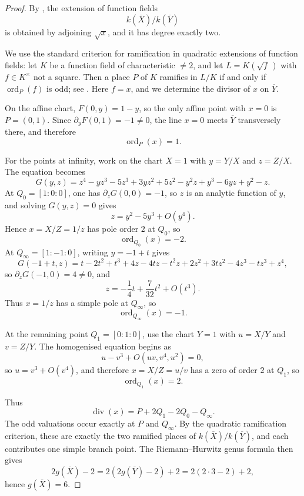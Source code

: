 \begin{proof}

By , the extension of function fields
\[
  k(\overline{X})/k(\overline{Y})
\]
is obtained by adjoining \(\sqrt{x}\), and it has degree exactly two.

We use the standard criterion for ramification in quadratic extensions
of function fields: let \(K\) be a function field of characteristic
\(\neq 2\), and let \(L=K(\sqrt{f}\,)\) with \(f\in K^\times\) not a
square. Then a place \(P\) of \(K\) ramifies in \(L/K\) if and only if
\(\operatorname{ord}_P(f)\) is odd; see \cite[III.7.3]{Stichtenoth2009}.
Here \(f=x\), and we determine the divisor of \(x\) on \(\overline{Y}\).

On the affine chart, \(F(0,y)=1-y\), so the only affine point with
\(x=0\) is \(P=(0,1)\). Since \(\partial_y F(0,1)=-1\neq 0\), the line
\(x=0\) meets \(\overline{Y}\) transversely there, and therefore
\[
  \operatorname{ord}_P(x)=1.
\]

For the points at infinity, work on the chart \(X=1\) with
\(y=Y/X\) and \(z=Z/X\). The equation becomes
\[
  G(y,z)=z^4-yz^3-5z^3+3yz^2+5z^2-y^2z+y^3-6yz+y^2-z.
\]
At \(Q_0=[1:0:0]\), one has \(\partial_z G(0,0)=-1\), so \(z\) is an
analytic function of \(y\), and solving \(G(y,z)=0\) gives
\[
  z=y^2-5y^3+O(y^4).
\]
Hence \(x=X/Z=1/z\) has pole order \(2\) at \(Q_0\), so
\[
  \operatorname{ord}_{Q_0}(x)=-2.
\]
At
\(Q_\infty=[1:-1:0]\), writing \(y=-1+t\) gives
\[
  G(-1+t,z)=t-2t^2+t^3+4z-4tz-t^2z
  +2z^2+3tz^2-4z^3-tz^3+z^4,
\]
so \(\partial_z G(-1,0)=4\neq 0\), and
\[
  z=-\frac14t+\frac{7}{32}t^2+O(t^3).
\]
Thus \(x=1/z\) has a simple pole at \(Q_\infty\), so
\[
  \operatorname{ord}_{Q_\infty}(x)=-1.
\]

At the remaining point \(Q_1=[0:1:0]\), use the chart \(Y=1\) with
\(u=X/Y\) and \(v=Z/Y\). The homogenised equation begins as
\[
  u-v^3+O(uv,v^4,u^2)=0,
\]
so \(u=v^3+O(v^4)\), and therefore \(x=X/Z=u/v\) has a zero of order
\(2\) at \(Q_1\), so
\[
  \operatorname{ord}_{Q_1}(x)=2.
\]

Thus
\[
  \operatorname{div}(x)=P+2Q_1-2Q_0-Q_\infty.
\]
The odd valuations occur exactly at \(P\) and \(Q_\infty\). By the
quadratic ramification criterion, these are exactly the two ramified
places of \(k(\overline{X})/k(\overline{Y})\), and each contributes one
simple branch point. The Riemann--Hurwitz genus formula
\cite[III.4.12]{Stichtenoth2009} then gives
\[
  2g(\overline{X})-2=2(2g(\overline{Y})-2)+2=2(2\cdot 3-2)+2,
\]
hence \(g(\overline{X})=6\).

\end{proof}

